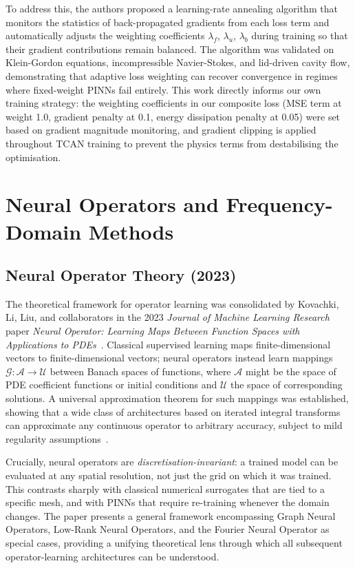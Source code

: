To address this, the authors proposed a learning-rate annealing algorithm that monitors the statistics of back-propagated gradients from each loss term and automatically adjusts the weighting coefficients $\lambda_f$, $\lambda_u$, $\lambda_b$ during training so that their gradient contributions remain balanced. The algorithm was validated on Klein-Gordon equations, incompressible Navier-Stokes, and lid-driven cavity flow, demonstrating that adaptive loss weighting can recover convergence in regimes where fixed-weight PINNs fail entirely. This work directly informs our own training strategy: the weighting coefficients in our composite loss (MSE term at weight 1.0, gradient penalty at 0.1, energy dissipation penalty at 0.05) were set based on gradient magnitude monitoring, and gradient clipping is applied throughout TCAN training to prevent the physics terms from destabilising the optimisation.

\section{Neural Operators and Frequency-Domain Methods}
\label{sec:bg:operators}

\subsection{Neural Operator Theory (2023)}
\label{sec:bg:no-theory}

The theoretical framework for operator learning was consolidated by Kovachki, Li, Liu, and collaborators in the 2023 \emph{Journal of Machine Learning Research} paper \emph{Neural Operator: Learning Maps Between Function Spaces with Applications to PDEs}~\cite{kovachki2023neural}. Classical supervised learning maps finite-dimensional vectors to finite-dimensional vectors; neural operators instead learn mappings $\mathcal{G}: \mathcal{A} \to \mathcal{U}$ between Banach spaces of functions, where $\mathcal{A}$ might be the space of PDE coefficient functions or initial conditions and $\mathcal{U}$ the space of corresponding solutions. A universal approximation theorem for such mappings was established, showing that a wide class of architectures based on iterated integral transforms can approximate any continuous operator to arbitrary accuracy, subject to mild regularity assumptions~\cite{kovachki2023neural}.

Crucially, neural operators are \emph{discretisation-invariant}: a trained model can be evaluated at any spatial resolution, not just the grid on which it was trained. This contrasts sharply with classical numerical surrogates that are tied to a specific mesh, and with PINNs that require re-training whenever the domain changes. The paper presents a general framework encompassing Graph Neural Operators, Low-Rank Neural Operators, and the Fourier Neural Operator as special cases, providing a unifying theoretical lens through which all subsequent operator-learning architectures can be understood.

